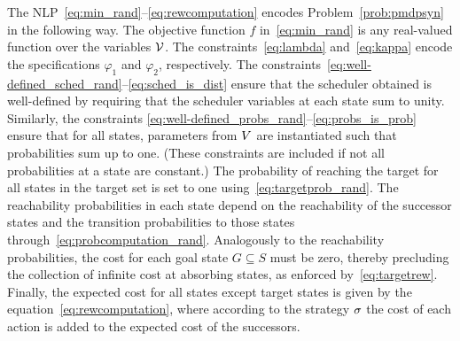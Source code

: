 The NLP~\eqref{eq:min_rand}--\eqref{eq:rewcomputation} encodes Problem~\ref{prob:pmdpsyn} in the following way.
The objective function $f$ in~\eqref{eq:min_rand} is any real-valued function over the variables $\mathcal{V}$. 
The constraints~\eqref{eq:lambda} and~\eqref{eq:kappa} encode the
specifications $\varphi_1$ and $\varphi_2$, respectively.
The constraints~\eqref{eq:well-defined_sched_rand}--\eqref{eq:sched_is_dist}
ensure that the scheduler obtained is well-defined by requiring that the
scheduler variables at each state sum to unity. 
Similarly, the constraints
\eqref{eq:well-defined_probs_rand}--\eqref{eq:probs_is_prob} ensure that
for all states, parameters from ${V}$ are instantiated such that
probabilities sum up to one. 
(These constraints are included if not all probabilities at a state are constant.)
The probability of reaching the target for all states in the target set is
set to one using~\eqref{eq:targetprob_rand}.
The reachability probabilities in each state 
depend on the reachability of the successor states and the transition
probabilities to those states through~\eqref{eq:probcomputation_rand}.
Analogously to the reachability probabilities, the cost for each goal state $G\subseteq S$
must be zero, thereby precluding the collection of infinite cost at
absorbing states, as enforced by~\eqref{eq:targetrew}.
Finally, the expected cost for all states except target states is given by
the equation~\eqref{eq:rewcomputation}, where according to the
strategy $\sigma$ the cost of each action is added to the expected cost of
the successors. 

	
